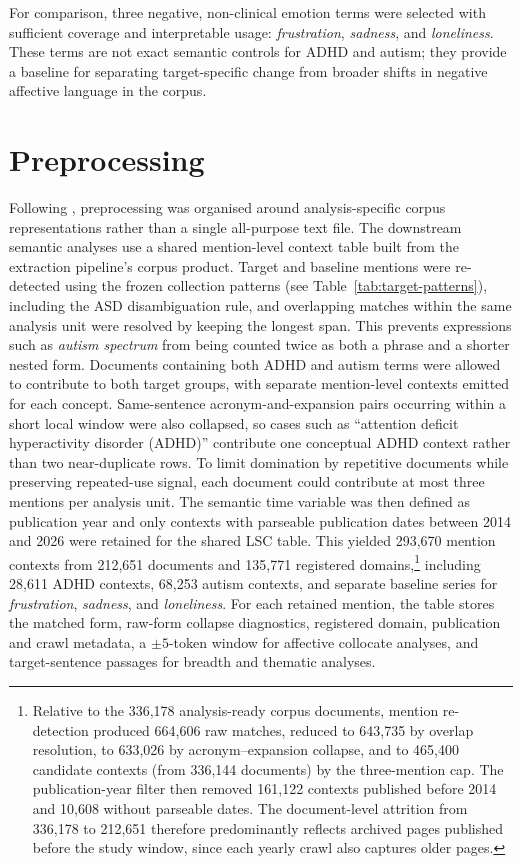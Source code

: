 For comparison, three negative, non-clinical emotion terms were selected with sufficient coverage and interpretable usage: \textit{frustration}, \textit{sadness}, and \textit{loneliness}. These terms are not exact semantic controls for ADHD and autism; they provide a baseline for separating target-specific change from broader shifts in negative affective language in the corpus.

\section{Preprocessing}

Following \citet{baesMultidimensionalFrameworkEvaluating2024}, preprocessing was organised around analysis-specific corpus representations rather than a single all-purpose text file. The downstream semantic analyses use a shared mention-level context table built from the extraction pipeline's corpus product. Target and baseline mentions were re-detected using the frozen collection patterns (see Table~\ref{tab:target-patterns}), including the ASD disambiguation rule, and overlapping matches within the same analysis unit were resolved by keeping the longest span. This prevents expressions such as \textit{autism spectrum} from being counted twice as both a phrase and a shorter nested form. Documents containing both ADHD and autism terms were allowed to contribute to both target groups, with separate mention-level contexts emitted for each concept. Same-sentence acronym-and-expansion pairs occurring within a short local window were also collapsed, so cases such as ``attention deficit hyperactivity disorder (ADHD)'' contribute one conceptual ADHD context rather than two near-duplicate rows. To limit domination by repetitive documents while preserving repeated-use signal, each document could contribute at most three mentions per analysis unit. The semantic time variable was then defined as publication year and only contexts with parseable publication dates between 2014 and 2026 were retained for the shared LSC table. This yielded 293,670 mention contexts from 212,651 documents and 135,771 registered domains,\footnote{Relative to the 336,178 analysis-ready corpus documents, mention re-detection produced 664,606 raw matches, reduced to 643,735 by overlap resolution, to 633,026 by acronym--expansion collapse, and to 465,400 candidate contexts (from 336,144 documents) by the three-mention cap. The publication-year filter then removed 161,122 contexts published before 2014 and 10,608 without parseable dates. The document-level attrition from 336,178 to 212,651 therefore predominantly reflects archived pages published before the study window, since each yearly crawl also captures older pages.} including 28,611 ADHD contexts, 68,253 autism contexts, and separate baseline series for \textit{frustration}, \textit{sadness}, and \textit{loneliness}. For each retained mention, the table stores the matched form, raw-form collapse diagnostics, registered domain, publication and crawl metadata, a \(\pm 5\)-token window for affective collocate analyses, and target-sentence passages for breadth and thematic analyses.

